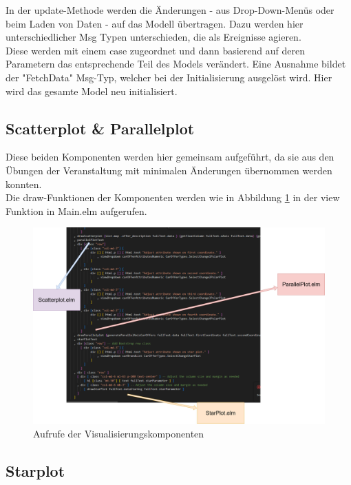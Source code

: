 In der update-Methode werden die Änderungen - aus Drop-Down-Menüs oder beim Laden von Daten - auf das Modell übertragen. Dazu werden hier unterschiedlicher Msg Typen unterschieden, die als Ereignisse agieren. \\
Diese werden mit einem case zugeordnet und dann basierend auf deren Parametern das entsprechende Teil des Models verändert. Eine Ausnahme bildet der "FetchData" Msg-Typ, welcher bei der Initialisierung ausgelöst wird. Hier wird das gesamte Model neu initialisiert. \\

\subsection{Scatterplot \& Parallelplot}

Diese beiden Komponenten werden hier gemeinsam aufgeführt, da sie aus den Übungen der Veranstaltung mit minimalen Änderungen übernommen werden konnten. \\
Die draw-Funktionen der Komponenten werden wie in Abbildung \ref{fig:aufrufe} in der view Funktion in Main.elm aufgerufen.
\begin{figure}[H]
    \centering
    \includegraphics[width=\textwidth]{img/aufrufe.png}
    \caption{Aufrufe der Visualisierungskomponenten}
    \label{fig:aufrufe}
\end{figure}

\subsection{Starplot}